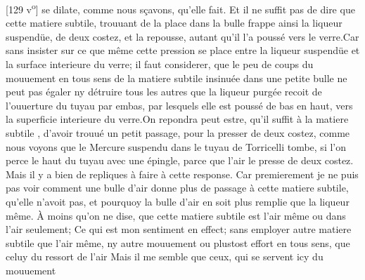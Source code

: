 [129 v\textsuperscript{o}] se dilate, comme nous s\c{c}avons, qu'elle fait. Et il ne suffit pas de dire que cette matiere subtile\protect{}, trouuant de la place dans la bulle frappe ainsi la liqueur\protect{} suspend\"{u}e, de deux costez, et la repousse, autant qu'il l'a pouss\'{e} vers le verre.\pend \pstart \footnotesize Car sans insister sur ce que même cette pression  se place entre la liqueur\protect{} suspend\"{u}e et la surface interieure du verre; il faut considerer, que le peu de coups du mouuement en tous sens de la matiere subtile\protect{} insinu\'{e}e dans une petite bulle ne peut pas \'{e}galer ny d\'{e}truire tous les autres que la liqueur\protect{} purg\'{e}e recoit  de l'ouuerture du tuyau par embas, par lesquels elle est pouss\'{e} de bas en haut, vers la superficie interieure du verre.\pend \pstart \footnotesize On repondra peut estre, qu'il suffit \`{a} la matiere subtile\protect{} , d'avoir trouu\'{e} un petit passage, pour la presser de deux costez, comme nous voyons que le Mercure\protect{} suspendu dans le tuyau de Torricelli\protect{} tombe, si l'on perce le haut du tuyau avec une \'{e}pingle, parce que l'air le presse de deux costez. Mais il y a bien de repliques \`{a} faire \`{a} cette response. Car premierement je ne puis pas voir comment une bulle d'air donne plus de passage \`{a} cette matiere subtile\protect{}, qu'elle n'avoit pas, et pourquoy la bulle d'air en soit plus remplie que la liqueur\protect{}  même. \`{A} moins qu'on ne dise, que cette matiere subtile\protect{} est l'air même ou dans l'air seulement;  Ce qui est mon sentiment en effect; sans employer autre matiere subtile\protect{} que l'air même, ny autre mouuement ou plustost effort en tous sens, que celuy du ressort de l'air  Mais il me semble que ceux, qui se servent icy du mouuement 